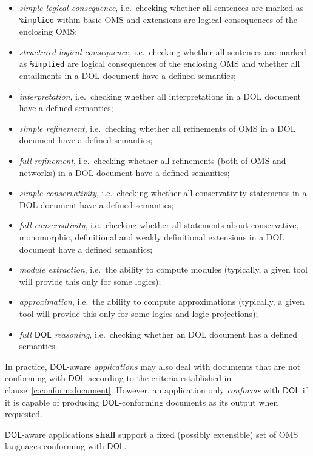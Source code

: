 \documentclass[10pt,fleqn,final]{scrreprt}
\newcommand*{\syntax}[1]{\texttt{#1}}
\newcommand*{\shall}{\textbf{shall}\xspace}
\newcommand*{\DOL}{\ensuremath{\mathsf{DOL}}\xspace}
\newcommand{\clauserefname}{clause}
\newcommand{\cref}[1]{\clauserefname~\ref{#1}}
\providecommand{\DIFadd}[1]{{\protect\color{blue}\uwave{#1}}} %
\providecommand{\DIFaddbegin}{} %
\providecommand{\DIFaddend}{} %
\begin{document}
\begin{itemize}
\begin{itemize}
\item \emph{simple logical consequence}, i.e.\ checking whether all sentences \DIFaddbegin \DIFadd{that }\DIFaddend are marked as \syntax{\%implied} within basic OMS
and extensions are logical consequences
of the enclosing OMS;
\item \emph{structured logical consequence}, i.e.\ checking whether all sentences \DIFaddbegin \DIFadd{that }\DIFaddend are marked as \syntax{\%implied} are logical consequences
  of the enclosing OMS and whether all entailments in a DOL document
  have a defined semantics;
\item \emph{interpretation}, i.e.\ checking whether all interpretations in a DOL document have a defined semantics;
\item \emph{simple refinement}, i.e.\ checking whether all
  refinements of OMS in a DOL document have a defined semantics;
\item \emph{full refinement}, i.e.\ checking whether all refinements
  (both of OMS and networks) in a DOL document have a defined
  semantics;
\item \emph{simple conservativity}, i.e.\ checking whether all conservativity
  statements in a DOL document have a defined semantics;
\item \emph{full conservativity}, i.e.\ checking whether all
  statements about conservative, monomorphic, definitional and weakly
  definitional extensions in a DOL document have a defined semantics;
\item \emph{module extraction}, i.e.\ the ability to compute modules
(typically, a given tool will provide this only for some logics);
\item \emph{approximation}, i.e.\ the ability to compute approximations
(typically, a given tool will provide this only for some logics
and logic projections);
\item \emph{full \DOL reasoning}, i.e.\ checking whether an DOL
  document has a defined semantics.
\end{itemize}
\end{itemize}


In practice, \DOL-aware \emph{applications} may also deal with documents that are not conforming 
with \DOL according to the criteria established in \cref{c:conform:document}.  However, an 
application only \emph{conforms} with \DOL if it is capable of producing \DOL-conforming documents as 
its output when requested.


\DOL-aware applications \shall support a fixed (possibly extensible) set of OMS languages
conforming with \DOL.
\end{document}
